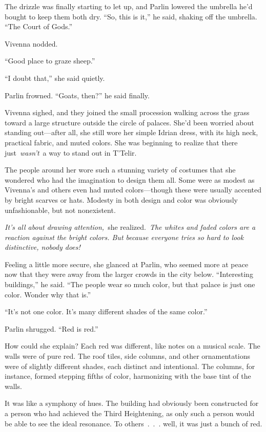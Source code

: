 The drizzle was finally starting to let up, and Parlin lowered the umbrella he’d bought to keep them both dry. “So, this is it,” he said, shaking off the umbrella. “The Court of Gods.”

Vivenna nodded.

“Good place to graze sheep.”

“I doubt that,” she said quietly.

Parlin frowned. “Goats, then?” he said finally.

Vivenna sighed, and they joined the small procession walking across the grass toward a large structure outside the circle of palaces. She’d been worried about standing out—after all, she still wore her simple Idrian dress, with its high neck, practical fabric, and muted colors. She was beginning to realize that there just~\textit{wasn’t}~a way to stand out in T’Telir.

The people around her wore such a stunning variety of costumes that she wondered who had the imagination to design them all. Some were as modest as Vivenna’s and others even had muted colors—though these were usually accented by bright scarves or hats. Modesty in both design and color was obviously unfashionable, but not nonexistent.

\textit{It’s all about drawing attention,}~she realized.~\textit{The whites and faded colors are a reaction against the bright colors. But because everyone tries so hard to look distinctive, nobody does!}

Feeling a little more secure, she glanced at Parlin, who seemed more at peace now that they were away from the larger crowds in the city below. “Interesting buildings,” he said. “The people wear so much color, but that palace is just one color. Wonder why that is.”

“It’s not one color. It’s many different shades of the same color.”

Parlin shrugged. “Red is red.”

How could she explain? Each red was different, like notes on a musical scale. The walls were of pure red. The roof tiles, side columns, and other ornamentations were of slightly different shades, each distinct and intentional. The columns, for instance, formed stepping fifths of color, harmonizing with the base tint of the walls.

It was like a symphony of hues. The building had obviously been constructed for a person who had achieved the Third Heightening, as only such a person would be able to see the ideal resonance. To others~.~.~. well, it was just a bunch of red.

